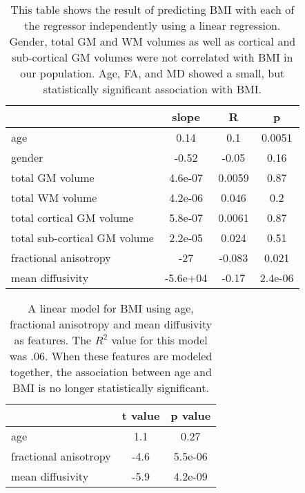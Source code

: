 \begin{table} 
    \begin{tabular}{l | c c c }
        & slope & R & p \\
        \hline
        age & 0.14 & 0.1 & 0.0051 \\
        gender & -0.52 & -0.05 & 0.16 \\
        total GM volume & 4.6e-07 & 0.0059 & 0.87 \\
        total WM volume & 4.2e-06 & 0.046 & 0.2 \\
        total cortical GM volume & 5.8e-07 & 0.0061 & 0.87 \\
        total sub-cortical GM volume & 2.2e-05 & 0.024 & 0.51 \\
        fractional anisotropy & -27 & -0.083 & 0.021 \\
        mean diffusivity & -5.6e+04 & -0.17 & 2.4e-06 \\
        \end{tabular} 
    \caption{\label{tab:basic} This table shows the result of predicting BMI with each of the regressor independently using a linear regression. Gender, total GM and WM volumes as well as cortical and sub-cortical GM volumes were not correlated with BMI in our population. Age, FA, and MD showed a small, but statistically significant association with BMI.} 
\end{table}

\begin{table} 
    \begin{tabular}{ l | c c }
        &t value & p value \\
        \hline
        age & 1.1 & 0.27 \\
        fractional anisotropy & -4.6 & 5.5e-06 \\
        mean diffusivity & -5.9 & 4.2e-09 \\ 
    \end{tabular} 
    \caption{\label{tab:linearmodel} A linear model for BMI using age, fractional anisotropy and mean diffusivity as features. The $R^2$ value for this model was .06. When these features are modeled together, the association between age and BMI is no longer statistically significant.} 
\end{table}